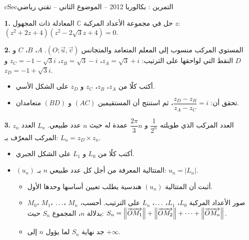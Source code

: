 \documentclass[12pt,a4paper]{article}
\newenvironment{BOX}[2]{\begin{otherlanguage}{english}\begin{arbox}{#1}{#2}}{\end{arbox}\end{otherlanguage}}
\newcounter{exo}
\newenvironment{tamrin}[1]{\stepcounter{exo}\begin{BOX}{cSec}{التمرين \theexo: #1}}{\end{BOX}}
\renewcommand{\ldots}{\mathinner{\ldotp\ldotp\ldotp}}
\renewcommand{\cdots}{\mathinner{\cdotp\cdotp\cdotp}}
\newenvironment{sq}{\begin{itemize}[leftmargin=2.4em,itemsep=3pt]}{\end{itemize}}
\newcommand{\qa}{\item[(أ)]}\newcommand{\qb}{\item[(ب)]}\newcommand{\qc}{\item[(جـ)]}\newcommand{\qd}{\item[(د)]}\newcommand{\qe}{\item[(هـ)]}
\newcommand{\QQ}[1]{\par\smallskip\textbf{#1.} }
\begin{document}
\begin{tamrin}{بكالوريا 2012 -- الموضوع الثاني -- تقني رياضي}
\QQ{1} حل في مجموعة الأعداد المركبة $\mathbb{C}$ المعادلة ذات المجهول $z$: $(z^2+2z+4)(z^2-2\sqrt3z+4)=0$.
\QQ{2} المستوي المركب منسوب إلى المعلم المتعامد والمتجانس $(O;\vec u,\vec v)$.
$A$، $B$، $C$ و $D$ النقط التي لواحقها على الترتيب: $z_A=\sqrt3+i$، $z_B=\sqrt3-i$، $z_C=-1-\sqrt3 i$ و $z_D=-1+\sqrt3 i$.
\begin{sq}
\qa أكتب كلًا من $z_A$، $z_B$، $z_C$ و $z_D$ على الشكل الأسي.
\qb تحقق أن: $\dfrac{z_D-z_B}{z_A-z_C}=i$، ثم استنتج أن المستقيمين $(AC)$ و $(BD)$ متعامدان.
\end{sq}
\QQ{3} $z_n$ العدد المركب الذي طويلته $\dfrac{1}{2^n}$ و $\dfrac{2\pi}{3}n$ عمدة له حيث $n$ عدد طبيعي.
$L_n$ العدد المركب المعرّف بـ: $L_n=z_D\times z_n$.
\begin{sq}
\qa أكتب كلًا من $L_0$ و $L_1$ على الشكل الجبري.
\qb $(u_n)$ المتتالية المعرفة من أجل كل عدد طبيعي $n$ بـ: $u_n=|L_n|$.
\begin{itemize}
\item أثبت أن المتتالية $(u_n)$ هندسية يطلب تعيين أساسها وحدها الأول.
\item $M_0$، $M_1$، $\ldots$، $M_n$ صور الأعداد المركبة $L_0$، $L_1$، $\ldots$، $L_n$ على الترتيب.
أحسب، بدلالة $n$، المجموع $S_n$ حيث: $S_n=\left\|\overrightarrow{OM_1}\right\|+\left\|\overrightarrow{OM_2}\right\|+\cdots+\left\|\overrightarrow{OM_n}\right\|$.
\item جد نهاية $S_n$ لما يؤول $n$ إلى $+\infty$.
\end{itemize}
\end{sq}
\end{tamrin}
\end{document}
